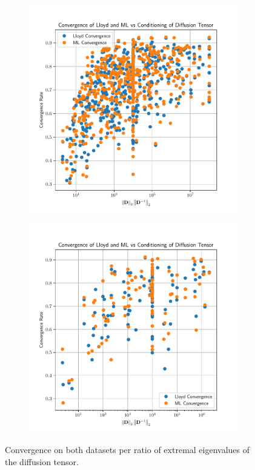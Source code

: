 \documentclass{article}
\begin{document}
\begin{figure}[h!]
  \centering
  \begin{subfigure}[t]{0.49\textwidth}
    \centering
    \includegraphics[width=\textwidth]{aniso3d_train_convergence_per_cond.pdf}
  \end{subfigure}
  \begin{subfigure}[t]{0.49\textwidth}
    \centering
    \includegraphics[width=\textwidth]{aniso3d_test_convergence_per_cond.pdf}
  \end{subfigure}
  \caption{Convergence on both datasets per ratio of extremal eigenvalues of the diffusion tensor.}
  \label{fig:aniso_conv_per_eps}
\end{figure}
\end{document}
